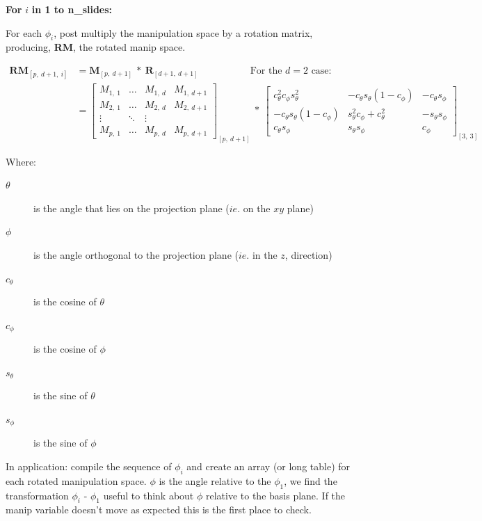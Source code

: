 \documentclass{monashthesis}
\begin{document}
\textbf{For } \(i\) \textbf{in 1 to n\_slides:}

For each \(\phi_i\), post multiply the manipulation space by a rotation
matrix, producing, \textbf{RM}, the rotated manip space.

\begin{align*}
  \textbf{RM}_{[p,~d+1,~i]}
  &= \textbf{M}_{[p,~d+1]} ~*~ \textbf{R}_{[d+1,~d+1]}
    ~~~~~~~~~~~~~~~~~~~~~~~~\text{For the $d=2$ case:} \\
  &= \begin{bmatrix}
    M_{1,~1} & \dots & M_{1,~d} & M_{1,~d+1} \\
    M_{2,~1} & \dots & M_{2,~d} & M_{2,~d+1} \\
    \vdots   & \ddots& \vdots   \\
    M_{p,~1} & \dots & M_{p,~d} & M_{p,~d+1}
  \end{bmatrix}_{[p,~d+1]}
    ~*~
  \begin{bmatrix}
    c_\theta^2 c_\phi s_\theta^2 &
    -c_\theta s_\theta (1 - c_\phi) &
    -c_\theta s_\phi \\
    -c_\theta s_\theta (1 - c_\phi) &
    s_\theta^2 c_\phi + c_\theta^2 &
    -s_\theta s_\phi \\
    c_\theta s_\phi &
    s_\theta s_\phi &
    c_\phi
  \end{bmatrix}_{[3,~3]}
\end{align*}

Where:

\begin{description}
  \item[$\theta$] is the angle that lies on the projection plane ($ie.$ on the $xy$ plane)
  \item[$\phi$] is the angle orthogonal to the projection plane ($ie.$ in the $z$,  direction)
  \item[$c_\theta$] is the cosine of $\theta$
  \item[$c_\phi$]   is the cosine of $\phi$
  \item[$s_\theta$] is the sine of   $\theta$
  \item[$s_\phi$]   is the sine of   $\phi$
\end{description}

In application: compile the sequence of \(\phi_i\) and create an array
(or long table) for each rotated manipulation space. \(\phi\) is the
angle relative to the \(\phi_1\), we find the transformation \(\phi_i\)
- \(\phi_1\) useful to think about \(\phi\) relative to the basis plane.
If the manip variable doesn't move as expected this is the first place
to check.
\end{document}
